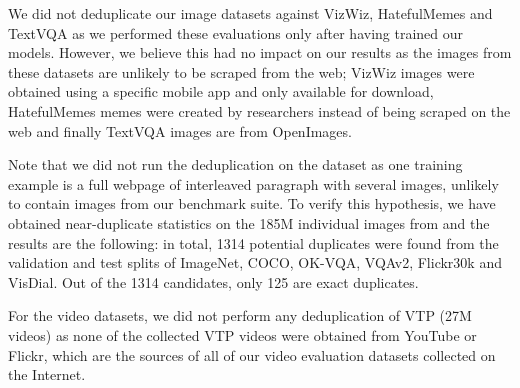 We did not deduplicate our image datasets against VizWiz, HatefulMemes and TextVQA as we performed these evaluations only after having trained our \method{} models.
However, we believe this had no impact on our results as the images from these datasets are unlikely to be scraped from the web; VizWiz images were obtained using a specific mobile app and only available for download, HatefulMemes memes were created by researchers instead of being scraped on the web and finally TextVQA images are from OpenImages.

Note that we did not run the deduplication on the \mmmw{} dataset as one training example is a full webpage of interleaved paragraph with several images, unlikely to contain images from our benchmark suite.
To verify this hypothesis, we have obtained near-duplicate statistics on the 185M individual images from \mmmw{} and the results are the following: in total, 1314 potential duplicates were found from the validation and test splits of ImageNet, COCO, OK-VQA, VQAv2, Flickr30k and VisDial. Out of the 1314 candidates, only 125 are exact duplicates.

For the video datasets, we did not perform any deduplication of VTP (27M videos) as none of the collected VTP videos were obtained from YouTube or Flickr, which are the sources of all of our video evaluation datasets collected on the Internet.



